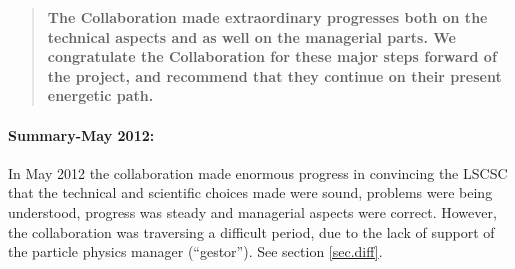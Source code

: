 \begin{quotation}
{\bf
The Collaboration made extraordinary progresses both on the technical aspects and as well on the managerial parts. We congratulate the Collaboration for these major steps forward of the project, and recommend that they continue on their present energetic path.}

\end{quotation}

\paragraph{Summary-May 2012:} In May 2012 the collaboration made enormous progress in convincing the
LSCSC that the technical and scientific choices made were sound, problems were being understood, progress was 
steady and managerial aspects were correct. However, the collaboration was traversing a difficult period, due to the
lack of support of the particle physics manager (``gestor''). See section \ref{sec.diff}.

